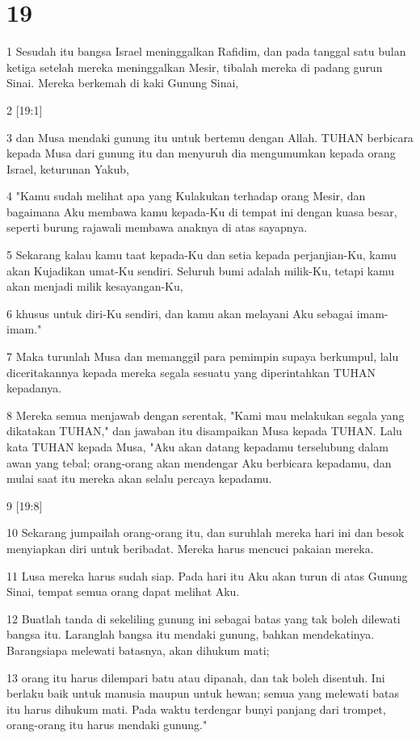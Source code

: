 \chapter{19}

\par 1 Sesudah itu bangsa Israel meninggalkan Rafidim, dan pada tanggal satu bulan ketiga setelah mereka meninggalkan Mesir, tibalah mereka di padang gurun Sinai. Mereka berkemah di kaki Gunung Sinai,
\par 2 [19:1]
\par 3 dan Musa mendaki gunung itu untuk bertemu dengan Allah. TUHAN berbicara kepada Musa dari gunung itu dan menyuruh dia mengumumkan kepada orang Israel, keturunan Yakub,
\par 4 "Kamu sudah melihat apa yang Kulakukan terhadap orang Mesir, dan bagaimana Aku membawa kamu kepada-Ku di tempat ini dengan kuasa besar, seperti burung rajawali membawa anaknya di atas sayapnya.
\par 5 Sekarang kalau kamu taat kepada-Ku dan setia kepada perjanjian-Ku, kamu akan Kujadikan umat-Ku sendiri. Seluruh bumi adalah milik-Ku, tetapi kamu akan menjadi milik kesayangan-Ku,
\par 6 khusus untuk diri-Ku sendiri, dan kamu akan melayani Aku sebagai imam-imam."
\par 7 Maka turunlah Musa dan memanggil para pemimpin supaya berkumpul, lalu diceritakannya kepada mereka segala sesuatu yang diperintahkan TUHAN kepadanya.
\par 8 Mereka semua menjawab dengan serentak, "Kami mau melakukan segala yang dikatakan TUHAN," dan jawaban itu disampaikan Musa kepada TUHAN. Lalu kata TUHAN kepada Musa, "Aku akan datang kepadamu terselubung dalam awan yang tebal; orang-orang akan mendengar Aku berbicara kepadamu, dan mulai saat itu mereka akan selalu percaya kepadamu.
\par 9 [19:8]
\par 10 Sekarang jumpailah orang-orang itu, dan suruhlah mereka hari ini dan besok menyiapkan diri untuk beribadat. Mereka harus mencuci pakaian mereka.
\par 11 Lusa mereka harus sudah siap. Pada hari itu Aku akan turun di atas Gunung Sinai, tempat semua orang dapat melihat Aku.
\par 12 Buatlah tanda di sekeliling gunung ini sebagai batas yang tak boleh dilewati bangsa itu. Laranglah bangsa itu mendaki gunung, bahkan mendekatinya. Barangsiapa melewati batasnya, akan dihukum mati;
\par 13 orang itu harus dilempari batu atau dipanah, dan tak boleh disentuh. Ini berlaku baik untuk manusia maupun untuk hewan; semua yang melewati batas itu harus dihukum mati. Pada waktu terdengar bunyi panjang dari trompet, orang-orang itu harus mendaki gunung."

